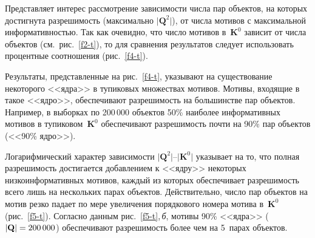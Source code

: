 \begin{multicols}{2}
Представляет интерес рассмотрение зави\-си\-мости числа пар объектов, на
которых достигнута разрешимость (максимально $\vert \mathbf{Q}^2\vert $), от чис\-ла
мотивов с максимальной информативностью. Так как очевидно, что чис\-ло
мотивов в~$\mathbf{K}^0$ зависит от числа объектов (см.\ рис.~\ref{f2-t}), то для
сравнения результатов следует использовать процентные соотношения
(рис.~\ref{f4-t}).


Результаты, представленные на рис.~\ref{f4-t}, указывают на существование
некоторого <<ядра>> в тупиковых множествах мотивов. Мотивы, входящие в
такое <<ядро>>, обеспечивают разрешимость на большинстве пар объектов.
Например, в выборках по 200\,000 объектов 50\% наиболее информативных
мотивов в тупиковом~$\mathbf{K}^0$ обеспечивают разрешимость почти на 90\% пар
объектов (<<90\% ядро>>).

Логарифмический характер зависимости $\vert \mathbf{Q}^2\vert$--$\vert \mathbf{K}^0\vert$
указывает на то, что полная разрешимость дости\-га\-ется добавлением к
<<ядру>> некоторых низкоинформативных мотивов, каждый из которых
обеспечивает разрешимость всего лишь на нескольких парах объектов.
Действительно, число пар объектов на мотив резко падает по мере
увеличения порядкового номера мотива в~$\mathbf{K}^0$ (рис.~\ref{f5-t}). Согласно
данным рис.~\ref{f5-t},\,\textit{б}, мотивы 90\% <<ядра>> ($\vert \mathbf{Q}\vert \hm
=200\,000$) обеспечивают разрешимость более чем на 5~парах объектов.

\begin{figure*} %
\vspace*{1pt}
 \begin{center}
 \mbox{%
 \epsfxsize=160.657mm
 }
 \end{center}
 \vspace*{-9pt}
\vspace*{12pt}
\end{figure*}


\end{multicols}
